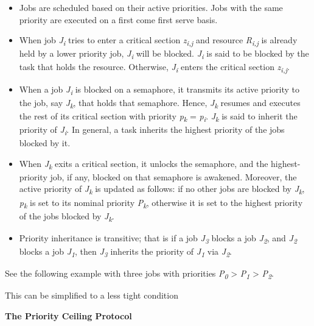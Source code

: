 \begin{itemize}
\item
  Jobs are scheduled based on their active priorities. Jobs with the
  same priority are executed on a first come first serve basis.
\item
  When job \emph{J\textsubscript{i}} tries to enter a critical section
  \emph{z\textsubscript{i,j}} and resource \emph{R\textsubscript{i,j}}
  is already held by a lower priority job, \emph{J\textsubscript{i}}
  will be blocked. \emph{J\textsubscript{i}} is said to be blocked by
  the task that holds the resource. Otherwise, \emph{J\textsubscript{i}}
  enters the critical section \emph{z\textsubscript{i,j}}.
\item
  When a job \emph{J\textsubscript{i}} is blocked on a semaphore, it
  transmits its active priority to the job, say
  \emph{J\textsubscript{k}}, that holds that semaphore. Hence,
  \emph{J\textsubscript{k}} resumes and executes the rest of its
  critical section with priority \emph{p\textsubscript{k}} =
  \emph{p\textsubscript{i}}. \emph{J\textsubscript{k}} is said to
  inherit the priority of \emph{J\textsubscript{i}}. In general, a task
  inherits the highest priority of the jobs blocked by it.
\item
  When \emph{J\textsubscript{k}} exits a critical section, it unlocks
  the semaphore, and the highest-priority job, if any, blocked on that
  semaphore is awakened. Moreover, the active priority of
  \emph{J\textsubscript{k}} is updated as follows: if no other jobs are
  blocked by \emph{J\textsubscript{k}}, \emph{p\textsubscript{k}} is set
  to its nominal priority \emph{P\textsubscript{k}}, otherwise it is set
  to the highest priority of the jobs blocked by
  \emph{J\textsubscript{k}}.
\item
  Priority inheritance is transitive; that is if a job
  \emph{J\textsubscript{3}} blocks a job \emph{J\textsubscript{2}}, and
  \emph{J\textsubscript{2}} blocks a job \emph{J\textsubscript{1}}, then
  \emph{J\textsubscript{3}} inherits the priority of
  \emph{J\textsubscript{1}} via \emph{J\textsubscript{2}}.
\end{itemize}

See the following example with three jobs with priorities
\emph{P\textsubscript{0}} \textgreater{} \emph{P\textsubscript{1}}
\textgreater{} \emph{P\textsubscript{2}}.

This can be simplified to a less tight condition

\textbf{The Priority Ceiling Protocol}

